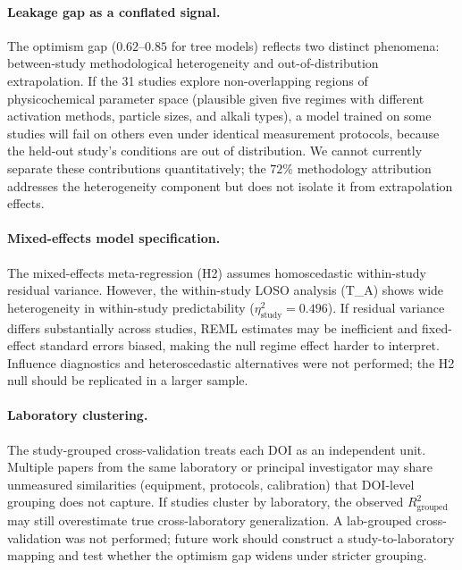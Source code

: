 \paragraph{Leakage gap as a conflated signal.}
The optimism gap ($0.62$--$0.85$ for tree models) reflects two distinct phenomena:
between-study methodological heterogeneity and out-of-distribution extrapolation.
If the 31 studies explore non-overlapping regions of physicochemical parameter
space (plausible given five regimes with different activation methods, particle sizes,
and alkali types), a model trained on some studies will fail on others even under
identical measurement protocols, because the held-out study's conditions are out of
distribution. We cannot currently separate these contributions quantitatively; the
$72\%$ methodology attribution addresses the heterogeneity component but does not
isolate it from extrapolation effects.

\paragraph{Mixed-effects model specification.}
The mixed-effects meta-regression (H2) assumes homoscedastic within-study residual
variance. However, the within-study LOSO analysis (T\_A) shows wide heterogeneity in
within-study predictability ($\eta^2_{\text{study}}\!=\!0.496$). If residual variance
differs substantially across studies, REML estimates may be inefficient and fixed-effect
standard errors biased, making the null regime effect harder to interpret. Influence
diagnostics and heteroscedastic alternatives were not performed; the H2 null should be
replicated in a larger sample.

\paragraph{Laboratory clustering.}
The study-grouped cross-validation treats each DOI as an independent unit. Multiple
papers from the same laboratory or principal investigator may share unmeasured
similarities (equipment, protocols, calibration) that DOI-level grouping does not
capture. If studies cluster by laboratory, the observed $R^2_{\text{grouped}}$ may
still overestimate true cross-laboratory generalization. A lab-grouped cross-validation
was not performed; future work should construct a study-to-laboratory mapping and
test whether the optimism gap widens under stricter grouping.
